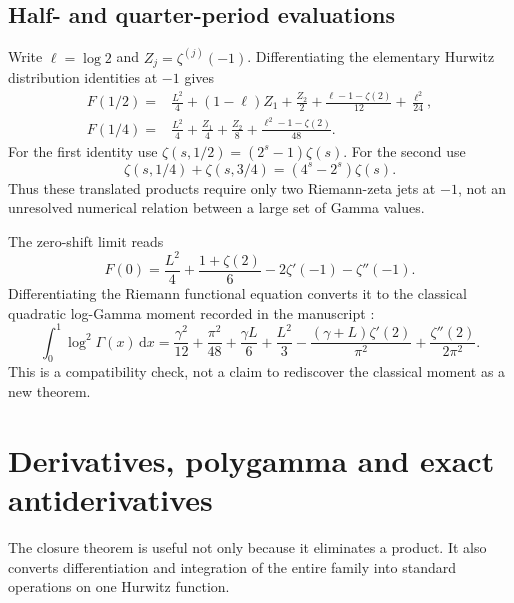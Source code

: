 \documentclass[11pt]{article}
\numberwithin{equation}{section}
\theoremstyle{definition}
\theoremstyle{remark}
\newcommand{\dd}{\,\mathrm d}
\begin{document}
\subsection{Half- and quarter-period evaluations}
Write $\ell=\log2$ and $Z_j=\zeta^{(j)}(-1)$. Differentiating the elementary
Hurwitz distribution identities at $-1$ gives
\begin{align}
 F(1/2)={}&\frac{L^2}{4}+(1-\ell)Z_1+\frac{Z_2}{2}
       +\frac{\ell-1-\zeta(2)}{12}+\frac{\ell^2}{24},
 \label{eq:F-half}\\
 F(1/4)={}&\frac{L^2}{4}+\frac{Z_1}{4}+\frac{Z_2}{8}
       +\frac{\ell^2-1-\zeta(2)}{48}.
 \label{eq:F-quarter}
\end{align}
For the first identity use $\zeta(s,1/2)=(2^s-1)\zeta(s)$.
For the second use
\[
 \zeta(s,1/4)+\zeta(s,3/4)=(4^s-2^s)\zeta(s).
\]
Thus these translated products require only two Riemann-zeta jets at
$-1$, not an unresolved numerical relation between a large set of
Gamma values.

The zero-shift limit reads
\begin{equation}
 F(0)=\frac{L^2}{4}+\frac{1+\zeta(2)}6
                          -2\zeta'(-1)-\zeta''(-1).
 \label{eq:F-zero}
\end{equation}
Differentiating the Riemann functional equation converts it to the
classical quadratic log-Gamma moment recorded in the manuscript
\cite{repo-integration}:
\[
 \int_0^1\log^2\Gamma(x)\dd x
 =\frac{\gamma^2}{12}+\frac{\pi^2}{48}+\frac{\gamma L}{6}
  +\frac{L^2}{3}-\frac{(\gamma+L)\zeta'(2)}{\pi^2}
  +\frac{\zeta''(2)}{2\pi^2}.
\]
This is a compatibility check, not a claim to rediscover the classical
moment as a new theorem.

\section{Derivatives, polygamma and exact antiderivatives}
\label{sec:primitives}

The closure theorem is useful not only because it eliminates a product.
It also converts differentiation and integration of the entire family
into standard operations on one Hurwitz function.
\end{document}
